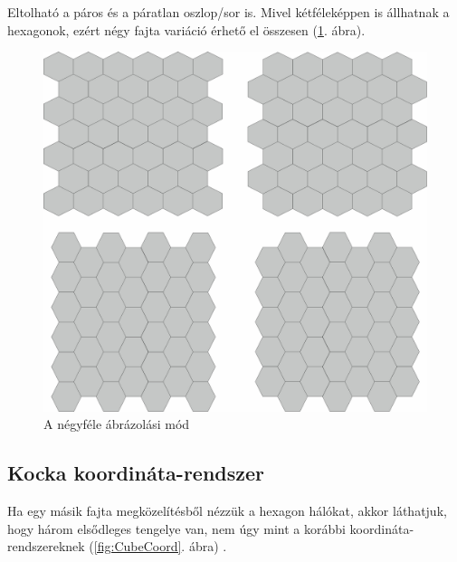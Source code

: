 Eltolható a páros és a páratlan oszlop/sor is. Mivel kétféleképpen is állhatnak a hexagonok, ezért négy fajta variáció érhető el összesen (\ref{fig:OffsetFour}. ábra).

\begin{figure}[h!]
\centering
\includegraphics[scale=0.2]{kepek/OffsetFour.jpg}
\caption{A négyféle ábrázolási mód}
\label{fig:OffsetFour}
\end{figure}

\newpage
\subsection{Kocka koordináta-rendszer}

Ha egy másik fajta megközelítésből nézzük a hexagon hálókat, akkor láthatjuk, hogy három elsődleges tengelye van, nem úgy mint a korábbi koordináta-rendszereknek (\ref{fig:CubeCoord}. ábra) \cite{HexagonalGrids}.

